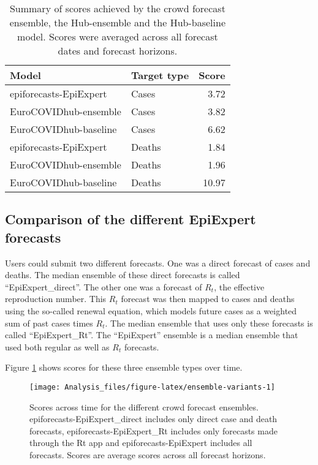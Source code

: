 \documentclass[
]{article}
\begin{document}
\begin{table}

\caption{\label{tab:scores-hub-comparison}Summary of scores achieved by the crowd forecast ensemble, the Hub-ensemble and the Hub-baseline model. Scores were averaged across all forecast dates and forecast horizons.}
\centering
\begin{tabular}[t]{l|l|r}
\hline
Model & Target type & Score\\
\hline
epiforecasts-EpiExpert & Cases & 3.72\\
\hline
EuroCOVIDhub-ensemble & Cases & 3.82\\
\hline
EuroCOVIDhub-baseline & Cases & 6.62\\
\hline
epiforecasts-EpiExpert & Deaths & 1.84\\
\hline
EuroCOVIDhub-ensemble & Deaths & 1.96\\
\hline
EuroCOVIDhub-baseline & Deaths & 10.97\\
\hline
\end{tabular}
\end{table}

\hypertarget{comparison-of-the-different-epiexpert-forecasts}{%
\subsection{Comparison of the different EpiExpert forecasts}\label{comparison-of-the-different-epiexpert-forecasts}}

Users could submit two different forecasts. One was a direct forecast of cases and deaths. The median ensemble of these direct forecasts is called ``EpiExpert\_direct''. The other one was a forecast of \(R_t\), the effective reproduction number. This \(R_t\) forecast was then mapped to cases and deaths using the so-called renewal equation, which models future cases as a weighted sum of past cases times \(R_t\). The median ensemble that uses only these forecasts is called ``EpiExpert\_Rt''. The ``EpiExpert'' ensemble is a median ensemble that used both regular as well as \(R_t\) forecasts.

Figure \ref{fig:ensemble-variants} shows scores for these three ensemble types over time.

\begin{figure}
\texttt{[image: Analysis\_files/figure-latex/ensemble-variants-1]} \caption{Scores across time for the different crowd forecast ensembles. epiforecasts-EpiExpert_direct includes only direct case and death forecasts, epiforecasts-EpiExpert_Rt includes only forecasts made through the Rt app and epiforecasts-EpiExpert includes all forecasts. Scores are average scores across all forecast horizons.}\label{fig:ensemble-variants}
\end{figure}
\end{document}
